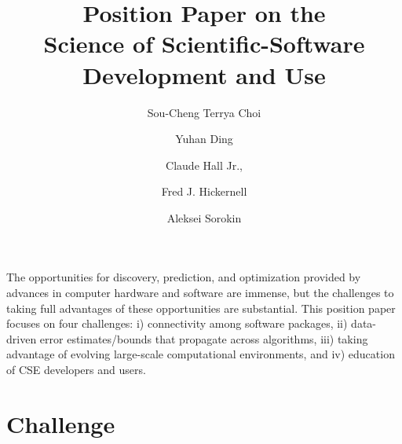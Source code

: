 \documentclass{amsart}
\begin{document}
\title{Position Paper on the \\ Science of Scientific-Software Development and Use}
\author{\vspace{-2ex}Sou-Cheng Terrya Choi}
\address[Choi, Ding, Hickernell, Sorokin]{Department of Applied Mathematics, RE 220, 10 W. 32nd St., Chicago, IL 60616}
\author{Yuhan Ding}
\author{Claude Hall Jr.,}
\address[Hall]{Birmingham Southern College, 900 Arkadelpha Rd, Birmingham, AL, 35254}
\author{Fred J. Hickernell}
\author{Aleksei Sorokin}


\maketitle

\vspace{-5ex}

The opportunities for discovery, prediction, and optimization provided by advances in computer hardware and software are immense, but the challenges to taking full advantages of these opportunities are substantial.  
This position paper focuses on four challenges: i) connectivity among software packages, ii) data-driven error estimates/bounds that propagate across algorithms, iii) taking advantage of evolving large-scale computational environments, and iv) education of CSE developers and users.


\section{Challenge} %
\end{document}
